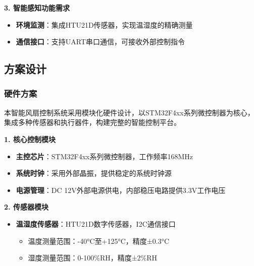 \textbf{3. 智能感知功能需求}

\begin{itemize}
    \vspace{-6pt}
  \item \textbf{环境监测}：集成HTU21D传感器，实现温湿度的精确测量
    \vspace{-6pt}
  \item \textbf{通信接口}：支持UART串口通信，可接收外部控制指令
\end{itemize}

\subsection{方案设计}

\subsubsection{硬件方案}

\qquad 本智能风扇控制系统采用模块化硬件设计，以STM32F4xx系列微控制器为核心，集成多种传感器和执行器件，构建完整的智能控制平台。

\textbf{1. 核心控制模块}
\begin{itemize}
    \vspace{-6pt}
  \item \textbf{主控芯片}：STM32F4xx系列微控制器，工作频率168MHz
    \vspace{-6pt}
  \item \textbf{系统时钟}：采用外部晶振，提供稳定的系统时钟源
    \vspace{-6pt}
  \item \textbf{电源管理}：DC 12V外部电源供电，内部稳压电路提供3.3V工作电压
\end{itemize}

\textbf{2. 传感器模块}
\begin{itemize}
    \vspace{-6pt}
  \item \textbf{温湿度传感器}：HTU21D数字传感器，I2C通信接口
    \begin{itemize}
        \vspace{-3pt}
      \item 温度测量范围：-40°C至+125°C，精度±0.3°C
        \vspace{-3pt}
      \item 湿度测量范围：0-100\%RH，精度±2\%RH
    \end{itemize}
    \vspace{-6pt}
\end{itemize}

